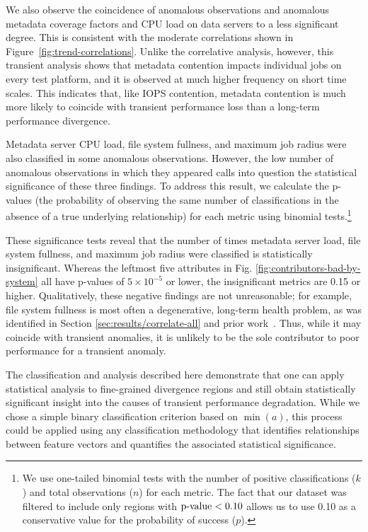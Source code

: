 We also observe the coincidence of anomalous observations and anomalous metadata coverage factors and CPU load on data servers to a less significant degree.
This is consistent with the moderate correlations shown in Figure~\ref{fig:trend-correlations}.
Unlike the correlative analysis, however, this transient analysis shows that metadata contention impacts individual jobs on every test platform, and it is observed at much higher frequency on short time scales.
This indicates that, like IOPS contention, metadata contention is much more likely to coincide with transient performance loss than a long-term performance divergence.

Metadata server CPU load, file system fullness, and maximum job radius were also classified in some anomalous observations.
However, the low number of anomalous observations in which they appeared calls into question the statistical significance of these three findings.
To address this result, we calculate the p-values (the probability of observing the same number of classifications in the absence of a true underlying relationship) for each metric using binomial tests.\footnote{
We use one-tailed binomial tests with the number of positive classifications ($k$) and total observations ($n$) for each metric.
The fact that our dataset was filtered to include only  regions with ${\textup{p-value} < 0.10}$ allows us to use 0.10 as a conservative value for the probability of success ($p$).}

These significance tests reveal that the number of times metadata server load, file system fullness, and maximum job radius were classified is statistically insignificant.
Whereas the leftmost five attributes in Fig. \ref{fig:contributors-bad-by-system} all have p-values of ${5 \times 10^{-5}}$ or lower, the insignificant metrics are 0.15 or higher.
Qualitatively, these negative findings are not unreasonable; for example, file system fullness is most often a degenerative, long-term health problem, as was identified in Section \ref{sec:results/correlate-all} and prior work~\cite{oral2014best,Lockwood2017}.
Thus, while it may coincide with transient anomalies, it is unlikely to be the sole contributor to poor performance for a transient anomaly.

The classification and analysis described here demonstrate that one can apply statistical analysis to fine-grained divergence regions and still obtain statistically significant insight into the causes of transient performance degradation.
While we chose a  simple binary classification criterion based on $\min(a)$, this process could be applied using any classification methodology that identifies relationships between feature vectors and quantifies the associated statistical significance.
